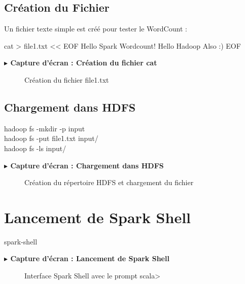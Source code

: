 \documentclass[12pt,a4paper]{report}
\newcommand{\etape}[1]{\vspace{6pt}\textbf{\color{bleuESP}$\blacktriangleright$ #1}\vspace{4pt}}
\begin{document}
\subsection{Création du Fichier}

Un fichier texte simple est créé pour tester le WordCount :

\begin{cmdbox}
cat > file1.txt << EOF
Hello Spark Wordcount!
Hello Hadoop Also :)
EOF
\end{cmdbox}

\etape{Capture d'écran : Création du fichier cat}
\begin{figure}[H]
  \centering
  \caption{Création du fichier file1.txt}
\end{figure}

\subsection{Chargement dans HDFS}

\begin{cmdbox}
hadoop fs -mkdir -p input \\
hadoop fs -put file1.txt input/ \\
hadoop fs -ls input/
\end{cmdbox}

\etape{Capture d'écran : Chargement dans HDFS}
\begin{figure}[H]
  \centering
  \caption{Création du répertoire HDFS et chargement du fichier}
\end{figure}

\section{Lancement de Spark Shell}

\begin{cmdbox}
spark-shell
\end{cmdbox}

\etape{Capture d'écran : Lancement de Spark Shell}
\begin{figure}[H]
  \centering
  \caption{Interface Spark Shell avec le prompt scala>}
\end{figure}
\end{document}
